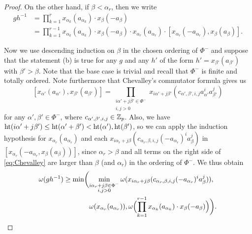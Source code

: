 \begin{proof}
On the other hand, if $\beta < \alpha_{r}$, then we write
\begin{align*}
  gh^{-1} &= \prod_{k=1}^{r} x_{\alpha_{k}}(a_{\alpha_{k}}) \cdot x_{\beta}(-a_{\beta}) \\
  &= \prod_{k=1}^{r-1} x_{\alpha_{k}}(a_{\alpha_{k}}) \cdot x_{\beta}(-a_{\beta}) \cdot x_{\alpha_{r}}(a_{\alpha_{r}}) \cdot [x_{\alpha_{r}}(-a_{\alpha_{r}}), x_{\beta}(a_{\beta})].
\end{align*}

Now we use descending induction on $\beta$ in the chosen ordering of $\Phi^{-}$ and suppose that the statement (b) is true for any $g$ and any $h'$ of the form $h' = x_{\beta'}(a_{\beta'})$ with $\beta' > \beta$. Note that the base case is trivial and recall that $\Phi^{-}$ is finite and totally ordered. Note furthermore that Chevalley's commutator formula gives us
\begin{equation}\label{eq:Chevalley}
  [x_{\alpha'}(a_{\alpha'}),x_{\beta'}(a_{\beta'})] = \prod_{\substack{i\alpha' + j\beta' \in \Phi^{-} \\ i,j>0}} x_{i\alpha'+ j\beta'}(c_{\alpha',\beta',i,j}a_{\alpha'}^{i}a_{\beta'}^{j})
\end{equation}
for any $\alpha',\beta' \in \Phi^{-}$, where $c_{\alpha',\beta',i,j} \in \mathbb{Z}_p$. Also, we have $\operatorname{ht}(i\alpha'+j\beta') \leq \operatorname{ht}(\alpha'+\beta') < \operatorname{ht}(\alpha'),\operatorname{ht}(\beta')$, so we can apply the induction hypothesis for $x_{\alpha_{r}}(a_{\alpha_{r}})$ and each $x_{i\alpha_{r}+j\beta}(c_{\alpha_{r},\beta,i,j}(-a_{\alpha_{r}})^{i}a_{\beta}^{j})$ in $[x_{\alpha_{r}}(-a_{\alpha_{r}},x_{\beta}(a_{\beta}))]$, since $\alpha_{r} > \beta$ and all terms on the right side of \eqref{eq:Chevalley} are larger than $\beta$ (and $\alpha_{r}$) in the ordering of $\Phi^{-}$. We thus obtain
\begin{equation}\label{eq:omega-par-ginvh}
  \begin{aligned}
    \omega(gh^{-1}) &\geq \min\biggl(\min_{\substack{i\alpha_{r}+j\beta \in \Phi^{-} \\ i,j>0}} \omega(x_{i\alpha_{r} + j\beta}(c_{\alpha_{r},\beta,i,j}(-a_{\alpha_{r}})^{i}a_{\beta}^{j})), \\*
    &\phantom{{} \geq \min\biggl( {}} \omega(x_{\alpha_{r}}(a_{\alpha_{r}})), \omega\Bigl( \prod_{k=1}^{r-1} x_{\alpha_k}(a_{\alpha_k}) \cdot x_{\beta}(-a_{\beta}) \Bigr) \biggr).
  \end{aligned}
\end{equation}


\end{proof}
